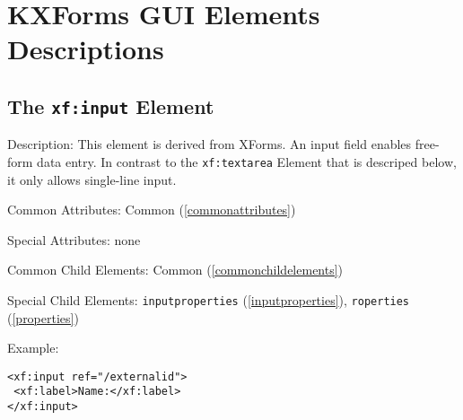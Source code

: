 
\section{ KXForms GUI Elements Descriptions}
\label{guielements}

\subsection{ The \texttt{xf:input} Element}
\begin{description}
 \item Description: This element is derived from XForms. An input field enables free-form data entry. In contrast to the \texttt{xf:textarea} Element that is descriped below, it only allows single-line input.

 \item Common Attributes: Common (\ref{commonattributes})

 \item Special Attributes: none

 \item Common Child Elements: Common (\ref{commonchildelements})

 \item Special Child Elements: \texttt{inputproperties} (\ref{inputproperties}), \texttt{roperties} (\ref{properties})

 \item Example: 

\begin{lstlisting}[caption=\texttt{xf:input} Element]
<xf:input ref="/externalid">
 <xf:label>Name:</xf:label>
</xf:input>
\end{lstlisting}
\end{description}










